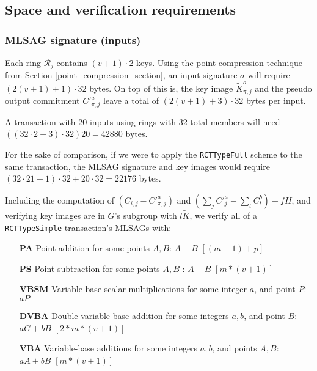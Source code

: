\subsection{Space and verification requirements}

\subsubsection*{MLSAG signature (inputs)}

Each ring \(\mathcal{R}_j\) contains \((v+1) \cdot 2\) keys. Using the point compression technique from Section \ref{point_compression_section}, an input signature $\sigma$ will require \( (2(v+1) + 1) \cdot 32  \) bytes. On top of this is, the key image $\tilde{K}^o_{\pi,j}$ and the pseudo output commitment $C'^a_{\pi,j}$ leave a total of $(2(v+1)+3) \cdot 32$ bytes per input.

A transaction with 20 inputs using rings with 32 total members will need \(((32 \cdot 2 + 3) \cdot 32) 20 = 42880 \) bytes.

For the sake of comparison, if we were to apply the {\tt RCTTypeFull} scheme to the same transaction, the MLSAG signature and key images would require \(( 32 \cdot 21 + 1) \cdot 32 + 20 \cdot 32 = 22176\) bytes.

Including the computation of \( (C_{i, j} - C'^a_{\pi, j}) \) and \( (\sum_j C'^a_{j} - \sum_t C^b_{t}) - f H \), and verifying key images are in $G$'s subgroup with $l \tilde{K}$, we verify all of a {\tt RCTTypeSimple} transaction's MLSAGs with:

\begin{itemize}
    \setlength\itemsep{\listspace}
    \item [\textbf{PA}] Point addition for some points $A, B$: $A + B$ \quad \([(m-1) + p]\)%
    \item [\textbf{PS}] Point subtraction for some points $A, B$ : $A - B$ \quad \([m*(v+1)]\)
    \item [\textbf{VBSM}] Variable-base scalar multiplications for some integer $a$, and point $P$: $a P$ \quad [$m$ + 1]
    \item [\textbf{DVBA}] Double-variable-base addition for some integers $a, b$, and point $B$: $a G + b B$ \quad \([2*m*(v+1)]\)
    \item [\textbf{VBA}] Variable-base additions for some integers $a, b$, and points $A, B$: $a A + b B$ \quad \([m*(v+1)]\)
\end{itemize}


